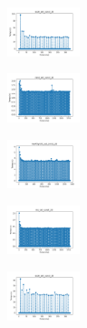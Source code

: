 \begin{figure}[H]
    \begin{subfigure}
        \centering
        \includegraphics[width=0.234\textwidth]{img/am10/ecoli_set_const_20_589741062_time.png}
    \end{subfigure}
    \hfill
    \begin{subfigure}
        \centering
        \includegraphics[width=0.234\textwidth]{img/am10/rand_set_const_20_589741062_time.png}
    \end{subfigure}
    \hfill
    \begin{subfigure}
        \centering
        \includegraphics[width=0.234\textwidth]{img/am10/newthyroid_set_const_20_589741062_time.png}
    \end{subfigure}
    \hfill
    \begin{subfigure}
        \centering
        \includegraphics[width=0.234\textwidth]{img/am10/iris_set_const_20_277451237_time.png}
    \end{subfigure}
    \hfill
    \begin{subfigure}
        \centering
        \includegraphics[width=0.234\textwidth]{img/am10/ecoli_set_const_20_277451237_time.png}
    \end{subfigure}
    \hfill
    \begin{subfigure}
        \centering

\end{subfigure}
\end{figure}
